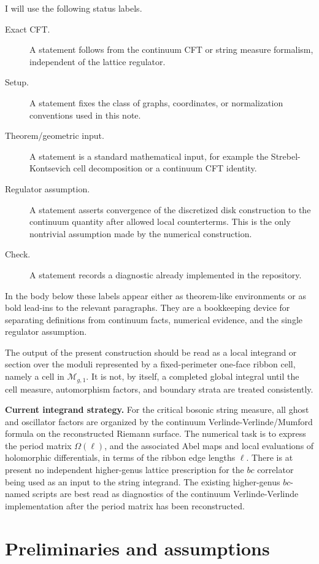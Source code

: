 \documentclass[11pt]{article}
\numberwithin{equation}{section}
\newcommand{\cM}{\mathcal M}
\begin{document}
I will use the following status labels.

\begin{description}
\item[Exact CFT.] A statement follows from the continuum CFT or string measure
formalism, independent of the lattice regulator.
\item[Setup.] A statement fixes the class of graphs, coordinates, or
normalization conventions used in this note.
\item[Theorem/geometric input.] A statement is a standard mathematical input,
for example the Strebel-Kontsevich cell decomposition or a continuum CFT
identity.
\item[Regulator assumption.] A statement asserts convergence of the
discretized disk construction to the continuum quantity after allowed local
counterterms.  This is the only nontrivial assumption made by the numerical
construction.
\item[Check.] A statement records a diagnostic already implemented in the
repository.
\end{description}
In the body below these labels appear either as theorem-like environments or as
bold lead-ins to the relevant paragraphs.  They are a bookkeeping device for
separating definitions from continuum facts, numerical evidence, and the single
regulator assumption.

The output of the present construction should be read as a local integrand or
section over the moduli represented by a fixed-perimeter one-face ribbon cell,
namely a cell in \(\cM_{g,1}\).  It is not, by itself, a completed global
integral until the cell measure, automorphism factors, and boundary strata are
treated consistently.

\noindent\textbf{Current integrand strategy.}
For the critical bosonic string measure, all ghost and oscillator factors are
organized by the continuum Verlinde-Verlinde/Mumford formula on the reconstructed
Riemann surface.  The numerical task is to express the period matrix
\(\Omega(\ell)\), and the associated Abel maps and local evaluations of
holomorphic differentials, in terms of the ribbon edge lengths \(\ell\).  There
is at present no independent higher-genus lattice prescription for the \(bc\)
correlator being used as an input to the string integrand.  The existing
higher-genus \(bc\)-named scripts are best read as diagnostics of the continuum
Verlinde-Verlinde implementation after the period matrix has been reconstructed.

\section{Preliminaries and assumptions}
\end{document}

